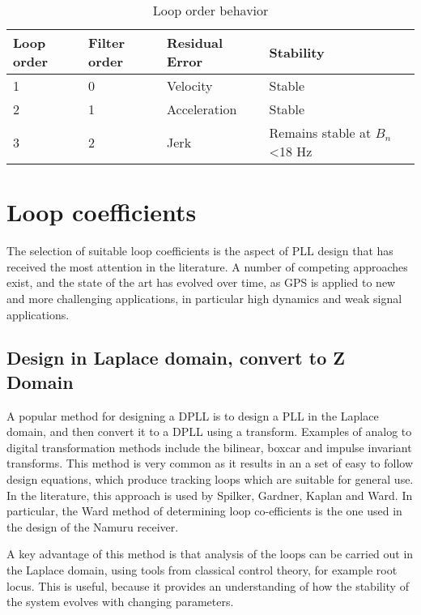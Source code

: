 \begin{table}[h]
\centering
\begin{tabular}{|l|l|l|l|}
\hline
Loop order & Filter order & Residual Error & Stability                               \\ \hline
1          & 0            & Velocity       & Stable                                  \\ \hline
2          & 1            & Acceleration   & Stable                                  \\ \hline
3          & 2            & Jerk           & Remains stable at $B_n$ \textless 18 Hz \\ \hline
\end{tabular}
\caption{Loop order behavior}
\label{table:LoopOrders}
\end{table}

\section{Loop coefficients}

The selection of suitable loop coefficients is the aspect of \ac{PLL} design that has received the most attention in the literature. A number of competing approaches exist, and the state of the art has evolved over time, as \ac{GPS} is applied to new and more challenging applications, in particular high dynamics and weak signal applications.

\subsection{Design in Laplace domain, convert to Z Domain}
A popular method for designing a \ac{DPLL} is to design a \ac{PLL} in the Laplace domain, and then convert it to a \ac{DPLL} using a transform. Examples of analog to digital transformation methods include the bilinear, boxcar and impulse invariant transforms. This method is very common as it results in an a set of easy to follow design equations, which produce tracking loops which are suitable for general use. In the literature, this approach is used by Spilker\cite{Spilker}, Gardner\cite{Gardner}, Kaplan\cite{Kaplan} and Ward\cite{Ward}. In particular, the Ward method of determining loop co-efficients is the one used in the design of the Namuru receiver.

A key advantage of this method is that analysis of the loops can be carried out in the Laplace domain, using tools from classical control theory, for example root locus\cite{Nise}. This is useful, because it provides an understanding of how the stability of the system evolves with changing parameters. 

